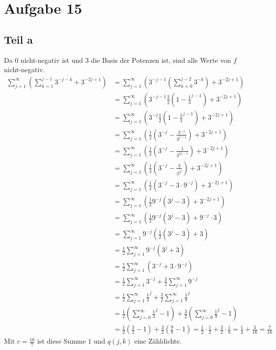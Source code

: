 \documentclass[10pt,a4paper]{article}
\begin{document}
\section{Aufgabe 15}

\subsection{Teil a}
Da $0$ nicht-negativ ist und $3$ die Basis der Potenzen ist, sind alle Werte von $f$ nicht-negativ.
\begin{align*}
  \sum_{j = 1}^{\infty} \left( \sum_{k = 1}^{j - 1} 3^{-j -k} + 3^{-2j + 1} \right) & = \sum_{j = 1}^{\infty} \left( 3^{-j - 1} \left( \sum_{k = 0}^{j - 2} 3^{-k} \right) + 3^{-2j + 1} \right)\\
  & = \sum_{j = 1}^{\infty} \left( 3^{-j - 1} \frac{3}{2} \left( 1 - \frac{1}{3}^{j - 1} \right) + 3^{-2j + 1} \right)\\
  & = \sum_{j = 1}^{\infty} \left( 3^{-j} \frac{1}{2} \left( 1 - \frac{1}{3}^{j - 1} \right) + 3^{-2j + 1} \right)\\
  & = \sum_{j = 1}^{\infty} \left( \frac{1}{2} \left( 3^{-j} - \frac{3^{-j}}{3^{j - 1}} \right) + 3^{-2j + 1} \right)\\
  & = \sum_{j = 1}^{\infty} \left( \frac{1}{2} \left( 3^{-j} - \frac{1}{3^{2j - 1}} \right) + 3^{-2j + 1} \right)\\
  & = \sum_{j = 1}^{\infty} \left( \frac{1}{2} \left( 3^{-j} - \frac{3}{3^{2^{j}}} \right) + 3^{-2j + 1} \right)\\
  & = \sum_{j = 1}^{\infty} \left( \frac{1}{2} \left( 3^{-j} - 3 \cdot 9^{-j} \right) + 3^{-2j + 1} \right)\\
  & = \sum_{j = 1}^{\infty} \left( \frac{1}{2} 9^{-j} \left( 3^{j} - 3 \right) + 3^{-2j + 1} \right)\\
  & = \sum_{j = 1}^{\infty} \left( \frac{1}{2} 9^{-j} \left( 3^{j} - 3 \right) + 9^{-j} \cdot 3 \right)\\
  & = \sum_{j = 1}^{\infty} 9^{-j} \left( \frac{1}{2} \left( 3^{j} - 3 \right) + 3 \right)\\
  & = \frac{1}{2} \sum_{j = 1}^{\infty} 9^{-j} \left( 3^{j} + 3 \right)\\
  & = \frac{1}{2} \sum_{j = 1}^{\infty} \left( 3^{-j} + 3 \cdot 9^{-j} \right)\\
  & = \frac{1}{2} \sum_{j = 1}^{\infty} 3^{-j} + \frac{3}{2} \sum_{j = 1}^{\infty} 9^{-j}\\
  & = \frac{1}{2} \sum_{j = 1}^{\infty} \frac{1}{3}^{j} + \frac{3}{2} \sum_{j = 1}^{\infty} \frac{1}{9}^{j}\\
  & = \frac{1}{2} \left( \sum_{j = 0}^{\infty} \frac{1}{3}^{j} - 1 \right) + \frac{3}{2} \left( \sum_{j = 0}^{\infty} \frac{1}{9}^{j} - 1\right)\\
  & = \frac{1}{2} \left( \frac{3}{2} - 1 \right) + \frac{3}{2} \left( \frac{9}{8} - 1\right) = \frac{1}{2} \cdot \frac{1}{2} + \frac{3}{2} \cdot \frac{1}{8} = \frac{1}{4} + \frac{3}{16} = \frac{7}{16}
\end{align*}
Mit $c = \frac{16}{7}$ ist diese Summe $1$ und $q(j, k)$ eine Zähldichte.
\end{document}
